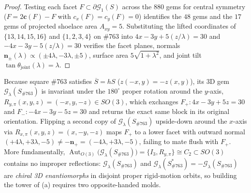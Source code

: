 \begin{proof}
Testing each facet $F\subset\partial\mathcal G_1(S)$ across the $880$ gems for central symmetry ($F=2\mathbf c(F)-F$ with $c_x(F)=c_y(F)=0$) identifies the $48$ gems and the $17$ gems of projected shoelace area $A_{xy}=5$. Substituting the lifted coordinates of $\{13,14,15,16\}$ and $\{1,2,3,4\}$ on \#763 into $4x-3y+5(z/\lambda)=30$ and $-4x-3y-5(z/\lambda)=30$ verifies the facet planes, normals $\mathbf n_\pm(\lambda)\propto(\pm4\lambda,-3\lambda,\pm5)$, surface area $5\sqrt{1+\lambda^2}$, and joint tilt $\tan\theta_{\mathrm{joint}}(\lambda)=\lambda$.
\end{proof}

\begin{remark}
\label{rem:chirality}
Because square \#763 satisfies $\overline S=hS$ ($z(-x,y)=-z(x,y)$), its 3D gem $\mathcal G_\lambda(S_{\#763})$ is invariant under the $180^\circ$ proper rotation around the $y$-axis, $R_{y,\pi}(x,y,z)=(-x,y,-z)\in SO(3)$, which exchanges $F_+\colon 4x-3y+5z=30$ and $F_-\colon -4x-3y-5z=30$ and returns the exact same block in its original orientation. Flipping a second copy of $\mathcal G_\lambda(S_{\#763})$ upside-down around the $x$-axis via $R_{x,\pi}(x,y,z)=(x,-y,-z)$ maps $F_+$ to a lower facet with outward normal $(+4\lambda,+3\lambda,-5)\ne-\mathbf n_+=(-4\lambda,+3\lambda,-5)$, failing to mate flush with $F_+$. More fundamentally, $\operatorname{Aut}_{O(3)}\bigl(\mathcal G_\lambda(S_{\#763})\bigr)=\{I_3,R_{y,\pi}\}\cong C_2\subset SO(3)$ contains no improper reflections: $\mathcal G_\lambda(S_{\#763})$ and $\mathcal G_\lambda(S^*_{\#763})=-\mathcal G_\lambda(S_{\#763})$ are \emph{chiral 3D enantiomorphs} in disjoint proper rigid-motion orbits, so building the tower of (a) requires two opposite-handed molds.
\end{remark}

